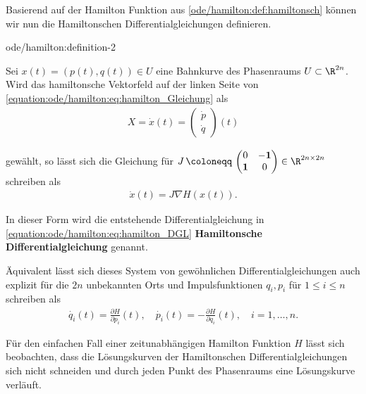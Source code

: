 \documentclass[letterpaper,10pt,german]{jupyterBook}
\begin{document}
\par
Basierend auf der Hamilton Funktion aus \cref{ode/hamilton:def:hamiltonsch} können wir nun die Hamiltonschen Differentialgleichungen definieren.
\begin{definition}{}{ode/hamilton:definition-2}



\par
Sei \(x(t) = (p(t),q(t)) \in U\) eine Bahnkurve des Phasenraums \(U \subset \R^{2n}\).
Wird das hamiltonsche Vektorfeld auf der linken Seite von \eqref{equation:ode/hamilton:eq:hamilton_Gleichung} als
\begin{align*}
X = \dot{x}(t) = \begin{pmatrix} \dot{p} \\ \dot{q} \end{pmatrix} (t)
\end{align*}
\par
gewählt, so lässt sich die Gleichung für \(J \, \coloneqq \, \begin{pmatrix}0 & -\mathbf{1}\\ \mathbf{1} & 0 \end{pmatrix} \in \R^{2n \times 2n}\) schreiben als
\begin{align}\label{equation:ode/hamilton:eq:hamilton_DGL}
\dot{x}(t) = J \nabla H(x(t)).
\end{align}
\par
In dieser Form wird die entstehende Differentialgleichung in \eqref{equation:ode/hamilton:eq:hamilton_DGL} \textbf{Hamiltonsche Differentialgleichung} genannt.

\par
Äquivalent lässt sich dieses System von gewöhnlichen Differentialgleichungen auch explizit für die \(2n\) unbekannten Orts  und Impulsfunktionen \(q_i, p_i\) für \(1 \leq i \leq n\) schreiben als
\begin{align*}
\dot{q_i}(t) = \frac{\partial H}{\partial p_i}(t), \quad \dot{p_i}(t) = -\frac{\partial H}{\partial q_i}(t), \quad i=1,\ldots,n.
\end{align*}\end{definition}

\par
Für den einfachen Fall einer zeitunabhängigen Hamilton Funktion \(H\) lässt sich beobachten, dass die Lösungskurven der Hamiltonschen Differentialgleichungen sich nicht schneiden und durch jeden Punkt des Phasenraums eine Lösungskurve verläuft.
\end{document}
